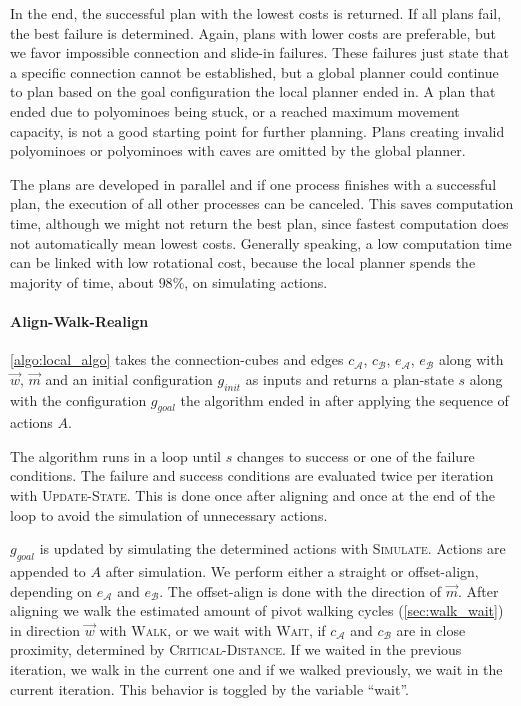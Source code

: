 In the end, the successful plan with the lowest costs is returned.
If all plans fail, the best failure is determined.
Again, plans with lower costs are preferable, but we favor impossible connection and slide-in failures.
These failures just state that a specific connection cannot be established, but a global planner could continue to plan based on the goal configuration the local planner ended in.
A plan that ended due to polyominoes being stuck, or a reached maximum movement capacity, is not a good starting point for further planning.
Plans creating invalid polyominoes or polyominoes with caves are omitted by the global planner.

The plans are developed in parallel and if one process finishes with a successful plan, the execution of all other processes can be canceled.
This saves computation time, although we might not return the best plan, since fastest computation does not automatically mean lowest costs.
Generally speaking, a low computation time can be linked with low rotational cost, because the local planner spends the majority of time, about $98\%$, on simulating actions.

\paragraph{Align-Walk-Realign}

\autoref{algo:local_algo} takes the connection-cubes and edges $c_\mathcal{A}$, $c_\mathcal{B}$, $e_\mathcal{A}$, $e_\mathcal{B}$ along with $\vec{w}$, $\vec{m}$ and an initial configuration $g_\textit{init}$ as inputs and returns a plan-state $s$ along with the configuration $g_\textit{goal}$ the algorithm ended in after applying the sequence of actions $A$.

The algorithm runs in a loop until $s$ changes to success or one of the failure conditions.
The failure and success conditions are evaluated twice per iteration with {\scshape Update-State}.
This is done once after aligning and once at the end of the loop to avoid the simulation of unnecessary actions.

$g_\textit{goal}$ is updated by simulating the determined actions with {\scshape Simulate}.
Actions are appended to $A$ after simulation.
We perform either a straight or offset-align, depending on $e_\mathcal{A}$ and $e_\mathcal{B}$.
The offset-align is done with the direction of $\vec{m}$.
After aligning we walk the estimated amount of pivot walking cycles (\autoref{sec:walk_wait}) in direction $\vec{w}$ with {\scshape Walk}, or we wait with {\scshape Wait}, if $c_\mathcal{A}$ and $c_\mathcal{B}$ are in close proximity, determined by {\scshape Critical-Distance}.
If we waited in the previous iteration, we walk in the current one and if we walked previously, we wait in the current iteration.
This behavior is toggled by the variable ``wait''.


